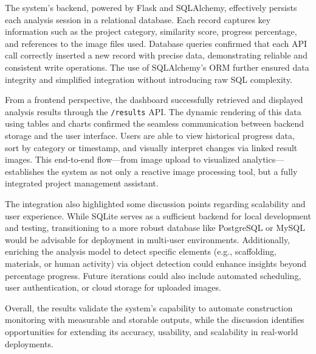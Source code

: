 The system’s backend, powered by Flask and SQLAlchemy, effectively persists each analysis session in a relational database. Each record captures key information such as the project category, similarity score, progress percentage, and references to the image files used. Database queries confirmed that each API call correctly inserted a new record with precise data, demonstrating reliable and consistent write operations. The use of SQLAlchemy’s ORM further ensured data integrity and simplified integration without introducing raw SQL complexity.

From a frontend perspective, the dashboard successfully retrieved and displayed analysis results through the \texttt{/results} API. The dynamic rendering of this data using tables and charts confirmed the seamless communication between backend storage and the user interface. Users are able to view historical progress data, sort by category or timestamp, and visually interpret changes via linked result images. This end-to-end flow—from image upload to visualized analytics—establishes the system as not only a reactive image processing tool, but a fully integrated project management assistant.

The integration also highlighted some discussion points regarding scalability and user experience. While SQLite serves as a sufficient backend for local development and testing, transitioning to a more robust database like PostgreSQL or MySQL would be advisable for deployment in multi-user environments. Additionally, enriching the analysis model to detect specific elements (e.g., scaffolding, materials, or human activity) via object detection could enhance insights beyond percentage progress. Future iterations could also include automated scheduling, user authentication, or cloud storage for uploaded images.

Overall, the results validate the system’s capability to automate construction monitoring with measurable and storable outputs, while the discussion identifies opportunities for extending its accuracy, usability, and scalability in real-world deployments.

